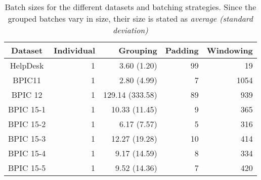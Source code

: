 \begin{table}[!htb]
\centering
\begin{tabular}{c|rrrr}
Dataset & Individual & Grouping & Padding & Windowing \\
\midrule
HelpDesk  & 1 & 3.60 (1.20) & 99 & 19\\
BPIC11    & 1 & 2.80 (4.99) & 7 & 1054\\
BPIC 12   & 1 & 129.14 (333.58) & 89 & 939\\
BPIC 15-1 & 1 & 10.33 (11.45) & 9 & 365\\
BPIC 15-2 & 1 & 6.17 (7.57) & 5 & 316\\
BPIC 15-3 & 1 & 12.27 (19.28) & 10 & 414\\
BPIC 15-4 & 1 & 9.17 (14.59) & 8 & 334\\
BPIC 15-5 & 1 & 9.52 (14.36) & 7 & 420\\
\end{tabular}
\caption[Batch sizes for each dataset and strategy]{Batch sizes for the different datasets and batching strategies. Since the grouped batches vary in size, their size is stated as \textit{average (standard deviation)}}
\label{tab:batch-sizes}
\end{table}
